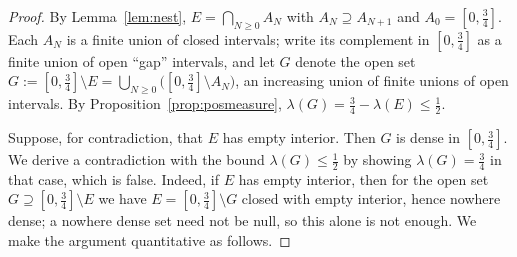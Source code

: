 \documentclass{amsart}
\theoremstyle{definition}
\begin{document}
\begin{proof}
By Lemma~\ref{lem:nest}, $E=\bigcap_{N\ge0}A_N$ with $A_N\supseteq A_{N+1}$ and $A_0=[0,\tfrac34]$.
Each $A_N$ is a finite union of closed intervals; write its complement in $[0,\tfrac34]$ as a finite
union of open ``gap'' intervals, and let $G$ denote the open set
$G:=[0,\tfrac34]\setminus E=\bigcup_{N\ge0}\bigl([0,\tfrac34]\setminus A_N\bigr)$, an increasing union
of finite unions of open intervals. By Proposition~\ref{prop:posmeasure},
$\lambda(G)=\tfrac34-\lambda(E)\le\tfrac12$.

Suppose, for contradiction, that $E$ has empty interior. Then $G$ is dense in $[0,\tfrac34]$. We
derive a contradiction with the bound $\lambda(G)\le\tfrac12$ by showing $\lambda(G)=\tfrac34$ in that
case, which is false. Indeed, if $E$ has empty interior, then for the open set $G\supseteq
[0,\tfrac34]\setminus E$ we have $E=[0,\tfrac34]\setminus G$ closed with empty interior, hence
nowhere dense; a nowhere dense set need not be null, so this alone is not enough. We make the
argument quantitative as follows.


\end{proof}
\end{document}
